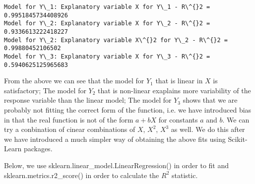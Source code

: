 \documentclass[11pt]{article}
\begin{document}
    \begin{Verbatim}[commandchars=\\\{\}]
Model for Y\_1: Explanatory variable X for Y\_1 - R\^{}2 = 0.9951845734408926
Model for Y\_2: Explanatory variable X for Y\_2 - R\^{}2 = 0.9336613222418227
Model for Y\_2: Explanatory variable X\^{}2 for Y\_2 - R\^{}2 = 0.99880452106502
Model for Y\_3: Explanatory variable X for Y\_3 - R\^{}2 = 0.5940625125965683

    \end{Verbatim}

    From the above we can see that the model for \(Y_1\) that is linear in
\(X\) is satisfactory; The model for \(Y_2\) that is non-linear
exaplains more variability of the response variable than the linear
model; The model for \(Y_3\) shows that we are probably not fitting the
correct form of the function, i.e. we have introduced bias in that the
real function is not of the form \(a+bX\) for constants \(a\) and \(b\).
We can try a conbination of cinear combinations of \(X\), \(X^2\),
\(X^3\) as well. We do this after we have introduced a much simpler way
of obtaining the above fits using Scikit-Learn packages.

Below, we use sklearn.linear\_model.LinearRegression() in order to fit
and sklearn.metrics.r2\_score() in order to calculate the \(R^2\)
statistic.
\end{document}
